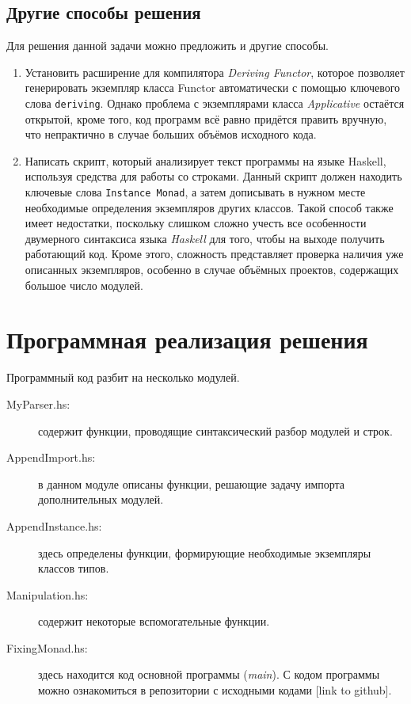 \subsection{Другие способы решения}
Для решения данной задачи можно предложить и другие способы.
\begin{enumerate}
\item Установить расширение для компилятора \textit{Deriving Functor}, которое позволяет генерировать экземпляр класса Functor автоматически с помощью ключевого слова \lstinline{deriving}. Однако проблема с экземплярами класса \textit{Applicative} остаётся открытой, кроме того, код программ всё равно придётся править вручную, что непрактично в случае больших объёмов исходного кода. 
\item Написать скрипт, который анализирует текст программы на языке Haskell, используя средства для работы со строками. Данный скрипт должен находить ключевые слова \lstinline{Instance Monad}, а затем дописывать в нужном месте необходимые определения экземпляров других классов. Такой способ также имеет недостатки, поскольку слишком сложно учесть все особенности двумерного синтаксиса языка \textit{Haskell} для того, чтобы на выходе получить работающий код. Кроме этого, сложность представляет проверка наличия уже описанных экземпляров, особенно в случае объёмных проектов, содержащих большое число модулей.
\end{enumerate}

\section{Программная реализация решения}
Программный код разбит на несколько модулей.
\begin{description}
    \item[MyParser.hs:] содержит функции, проводящие синтаксический разбор модулей и строк.
    \item[AppendImport.hs:] в данном модуле описаны функции, решающие задачу импорта дополнительных модулей.
    \item[AppendInstance.hs:] здесь определены функции, формирующие необходимые экземпляры классов типов.
    \item[Manipulation.hs:] содержит некоторые вспомогательные функции.
    \item[FixingMonad.hs:] здесь находится код основной программы (\textit{main}).
    С кодом программы можно ознакомиться в репозитории с исходными кодами [link to github].
\end{description}
